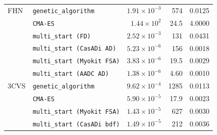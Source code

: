 \begin{table}[htbp]
\begin{tabular}{llrrr}
    \midrule
    FHN & \texttt{genetic\_algorithm} & $1.91\times 10^{-3}$ & 574 & 0.0125 \\
     & \texttt{CMA-ES} & $1.44\times 10^{2}$ & 24.5 & 4.0000 \\
     & \texttt{multi\_start (FD)} & $2.52\times 10^{-3}$ & 131 & 0.0431 \\
     & \texttt{multi\_start (CasADi AD)} & $5.23\times 10^{-6}$ & 156 & 0.0018 \\
     & \texttt{multi\_start (Myokit FSA)} & $3.83\times 10^{-6}$ & 19.5 & 0.0029 \\
     & \texttt{multi\_start (AADC AD)} & $1.38\times 10^{-6}$ & 4.60 & 0.0010 \\
    \midrule
    3CVS & \texttt{genetic\_algorithm} & $9.62\times 10^{-4}$ & 1285 & 0.0113 \\
     & \texttt{CMA-ES} & $5.90\times 10^{-5}$ & 17.9 & 0.0023 \\
     & \texttt{multi\_start (Myokit FSA)} & $1.43\times 10^{-5}$ & 627 & 0.0030 \\
     & \texttt{multi\_start (CasADi bdf)} & $1.49\times 10^{-5}$ & 212 & 0.0036 \\
    \bottomrule
  \end{tabular}
\end{table}
